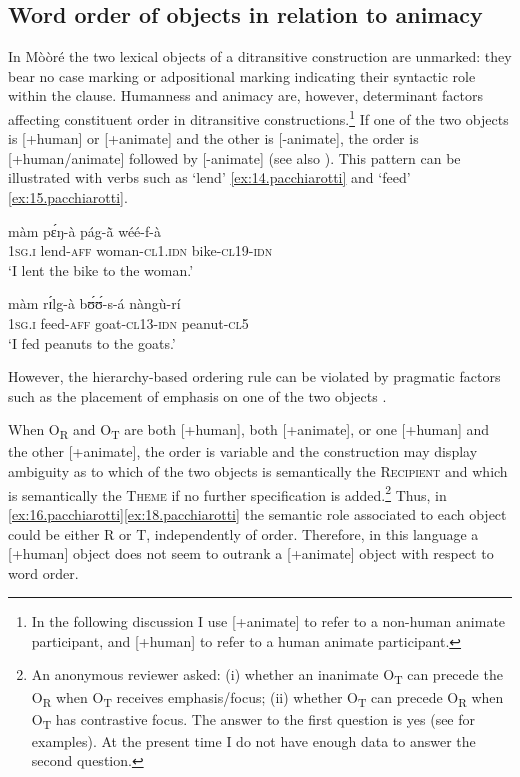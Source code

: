 \documentclass[output=paper]{langsci/langscibook}
\begin{document}
\subsection{Word order of objects in relation to animacy}\label{§4.2:word.pacchiarotti}

In M\`{o}\`{o}r\'{e} the two lexical objects of a ditransitive construction are unmarked: they bear no case marking or adpositional marking indicating their syntactic role within the clause. Humanness and animacy are, however, determinant factors affecting constituent order in ditransitive constructions.\footnote{In the following discussion I use [+animate] to refer to a non-human animate participant, and [+human] to refer to a human animate participant.} If one of the two objects is [+human] or [+animate] and the other is [-animate], the order is [+human/animate] followed by [-animate] (see also \citealt[394]{canu1974}). This pattern can be illustrated with verbs such as `lend' \ref{ex:14.pacchiarotti} and `feed' \ref{ex:15.pacchiarotti}.

\ea
\label{ex:14.pacchiarotti}
\gll m\`{a}m    pɛ́ŋ-à         p\'{a}g-\`{\~{a}}      w\'{e}\'{e}-f-\`{a}\\
\textsc{1sg.i  }  lend-\textsc{aff}        woman-\textsc{cl1.idn}  bike-\textsc{cl19-idn}\\
\glt `I lent the bike to the woman.'
\z

\ea
\label{ex:15.pacchiarotti}
\gll m\`{a}m    rɪ́lg-\`{a}      bʊ́ʊ́-s-\'{a}    n\`{a}ng\`{u}-r\'{i} \\
\textsc{1sg.i  }  feed-\textsc{aff}    goat-\textsc{cl13-idn}  peanut-\textsc{cl5}\\
\glt `I fed peanuts to the goats.'
\z

However, the hierarchy-based ordering rule can be violated by pragmatic factors such as the placement of emphasis on one of the two objects \citep[375]{kabore1985}.

When O\textsubscript{R} and O\textsubscript{T} are both [+human], both [+animate], or one [+human] and the other [+animate],  the order is variable and the construction may display ambiguity as to which of the two objects is semantically the \textsc{Recipient} and which is semantically the \textsc{Theme} if no further specification is added.\footnote{An anonymous reviewer asked: (i) whether an inanimate O\textsubscript{T} can precede the O\textsubscript{R} when O\textsubscript{T} receives emphasis/focus; (ii) whether O\textsubscript{T} can precede O\textsubscript{R} when O\textsubscript{T} has contrastive focus. The answer to the first question is yes (see \citealt[375]{kabore1985} for examples). At the present time I do not have enough data to answer the second question.} Thus, in \ref{ex:16.pacchiarotti}\ref{ex:18.pacchiarotti} the semantic role associated to each object could be either R or T, independently of order. Therefore, in this language a [+human] object does not seem to outrank a [+animate] object with respect to word order.
\end{document}
